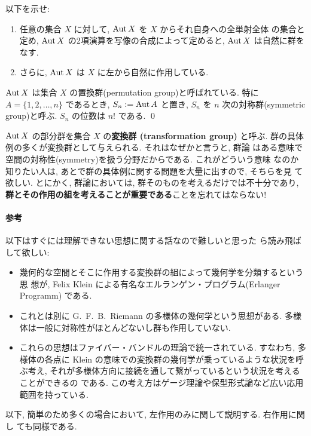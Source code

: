 \documentclass[12pt,twoside]{jarticle}
\def\Sym{S}
\def\Aut{\mathop{\text{\rm Aut}}\nolimits}
\begin{document}
\begin{question}[置換群と対称群]
  以下を示せ:
  \begin{enumerate}
  \item 任意の集合 $X$ に対して, $\Aut X$ を $X$ からそれ自身への全単射全体
    の集合と定め, $\Aut X$ の2項演算を写像の合成によって定めると, 
    $\Aut X$ は自然に群をなす. 
  \item さらに, $\Aut X$ は $X$ に左から自然に作用している.
  \end{enumerate}
  $\Aut X$ は集合 $X$ の置換群(permutation group)と呼ばれている.
  特に $A=\{1,2,\dots,n\}$ であるとき, $\Sym_n := \Aut A$ と置き, 
  $\Sym_n$ を $n$ 次の対称群(symmetric group)と呼ぶ.
  $\Sym_n$ の位数は $n!$ である.
  \qed
\end{question}

\noindent $\Aut X$ の部分群を集合 $X$ の{\bf 変換群 (transformation group)} 
と呼ぶ. 群の具体例の多くが変換群として与えられる. それはなぜかと言うと, 群論
はある意味で空間の対称性(symmetry)を扱う分野だからである. これがどういう意味
なのか知りたい人は, あとで群の具体例に関する問題を大量に出すので, そちらを見
て欲しい. 
とにかく, 群論においては, 群そのものを考えるだけでは不十分であり, 
{\bf 群とその作用の組を考えることが重要である}ことを忘れてはならない!

\paragraph{参考} 以下はすぐには理解できない思想に関する話なので難しいと思った
ら読み飛ばして欲しい:
\begin{itemize}
\item 幾何的な空間とそこに作用する変換群の組によって幾何学を分類するという思
  想が, Felix Klein による有名なエルランゲン・プログラム(Erlanger Programm)
  である.
\item これとは別に G.\ F.\ B.\ Riemann の多様体の幾何学という思想がある.
  多様体は一般に対称性がほとんどないし群も作用していない. 
\item これらの思想はファイバー・バンドルの理論で統一されている. すなわち, 多
  様体の各点に Klein の意味での変換群の幾何学が乗っているような状況を呼ぶ考え,
  それが多様体方向に接続を通して繋がっているという状況を考えることができるの
  である. この考え方はゲージ理論や保型形式論など広い応用範囲を持っている.
\end{itemize}

以下, 簡単のため多くの場合において, 左作用のみに関して説明する. 右作用に関し
ても同様である.
\end{document}
